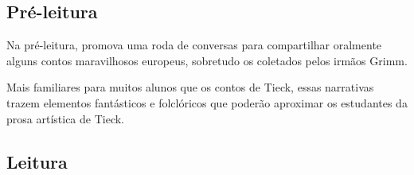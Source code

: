 \documentclass[11pt]{extarticle}
\begin{document}

\subsection{Pré-leitura}



Na pré-leitura, promova uma roda de conversas para
compartilhar oralmente alguns contos maravilhosos europeus, sobretudo os
coletados pelos irmãos Grimm.

Mais familiares para muitos alunos que os contos de Tieck, essas
narrativas trazem elementos fantásticos e folclóricos que poderão
aproximar os estudantes da prosa artística de Tieck.

\subsection{Leitura}

\end{document}
